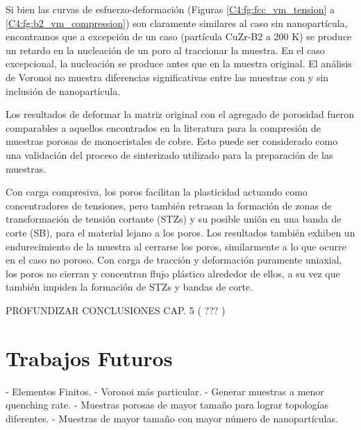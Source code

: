 Si bien las curvas de esfuerzo-deformación (Figuras \ref{C4:fg:fcc_vm_tension} a \ref{C4:fg:b2_vm_compression}) son claramente similares al caso sin nanopartícula, encontramos que a excepción de un caso (partícula CuZr-B2 a 200 K) se produce un retardo en la nucleación de un poro al traccionar la muestra. En el caso excepcional, la nucleación se produce antes que en la muestra original. El análisis de Voronoi no muestra diferencias significativas entre las muestras con y sin inclusión de nanopartícula. 

Los resultados de deformar la matriz original con el agregado de porosidad fueron comparables a aquellos encontrados en la literatura \citep{yuan14} para la compresión de muestras porosas de monocristales de cobre. Esto puede ser considerado como una validación del proceso de sinterizado utilizado para la preparación de las muestras.

Con carga compresiva, los poros facilitan la plasticidad actuando como concentradores de tensiones, pero también retrasan la formación de zonas de transformación de tensión cortante (STZs) y su posible unión en una banda de corte (SB), para el material lejano a los poros. Los resultados también exhiben un endurecimiento de la muestra al cerrarse los poros, similarmente a lo que ocurre en el caso no poroso. Con carga de tracción y deformación puramente uniaxial, los poros no cierran y concentran flujo plástico alrededor de ellos, a su vez que también impiden la formación de STZs y bandas de corte.

PROFUNDIZAR CONCLUSIONES CAP. 5 ( ??? )


\section{Trabajos Futuros}


- Elementos  Finitos.
- Voronoi más particular.
- Generar muestras a menor quenching rate.
- Muestras porosas de mayor tamaño para lograr topologías diferentes.
- Muestras de mayor tamaño con mayor número de nanopartículas.



